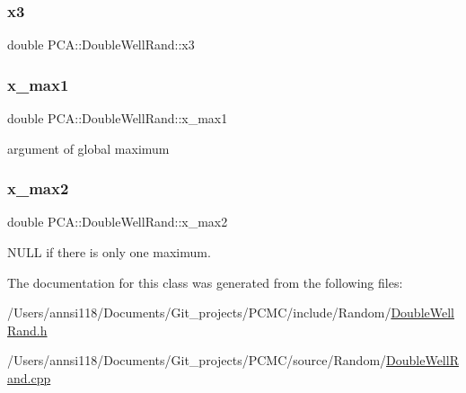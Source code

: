 \hypertarget{class_p_c_a_1_1_double_well_rand_a2ac7d1cea509a918639ccb8bef3f1d0a}{}\label{class_p_c_a_1_1_double_well_rand_a2ac7d1cea509a918639ccb8bef3f1d0a} 
\subsubsection{\texorpdfstring{x3}{x3}}
{\footnotesize\ttfamily double P\+C\+A\+::\+Double\+Well\+Rand\+::x3\hspace{0.3cm}{\ttfamily [private]}}

\hypertarget{class_p_c_a_1_1_double_well_rand_a69b543f7eb8dda81f522a2002af65456}{}\label{class_p_c_a_1_1_double_well_rand_a69b543f7eb8dda81f522a2002af65456} 
\subsubsection{\texorpdfstring{x\+\_\+max1}{x\_max1}}
{\footnotesize\ttfamily double P\+C\+A\+::\+Double\+Well\+Rand\+::x\+\_\+max1\hspace{0.3cm}{\ttfamily [private]}}



argument of global maximum 

\hypertarget{class_p_c_a_1_1_double_well_rand_a2fd3ef155f258ef1393fdb5ae503e2b0}{}\label{class_p_c_a_1_1_double_well_rand_a2fd3ef155f258ef1393fdb5ae503e2b0} 
\subsubsection{\texorpdfstring{x\+\_\+max2}{x\_max2}}
{\footnotesize\ttfamily double P\+C\+A\+::\+Double\+Well\+Rand\+::x\+\_\+max2\hspace{0.3cm}{\ttfamily [private]}}



N\+U\+LL if there is only one maximum. 



The documentation for this class was generated from the following files\+:\begin{DoxyCompactItemize}
\item 
/\+Users/annsi118/\+Documents/\+Git\+\_\+projects/\+P\+C\+M\+C/include/\+Random/\hyperlink{_double_well_rand_8h}{Double\+Well\+Rand.\+h}\item 
/\+Users/annsi118/\+Documents/\+Git\+\_\+projects/\+P\+C\+M\+C/source/\+Random/\hyperlink{_double_well_rand_8cpp}{Double\+Well\+Rand.\+cpp}\end{DoxyCompactItemize}

